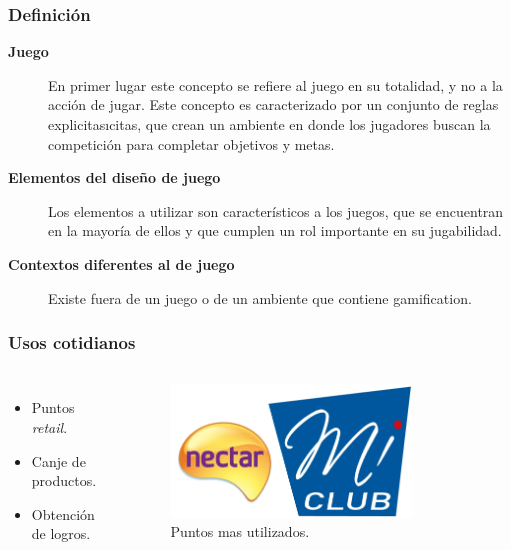 \documentclass[10pt, compress]{beamer}
\begin{document}
\begin{frame}
\frametitle{Definición}

\begin{description}
 \item[\textbf{Juego}] En primer lugar este concepto se refiere al juego en su totalidad, y no a la acción de jugar. 
Este concepto es caracterizado por un conjunto de reglas explicitasıcitas, que crean un ambiente en donde los 
jugadores buscan la competición para completar objetivos y metas.
 \item[\textbf{Elementos del diseño de juego}] Los elementos a utilizar son característicos a los juegos, que se 
encuentran en la mayoría de ellos y que cumplen un rol importante en su jugabilidad.
 \item[\textbf{Contextos diferentes al de juego}] Existe fuera de un juego o de un ambiente que contiene gamification.
\end{description}
\end{frame}

\begin{frame}
 \frametitle{Usos cotidianos}
\begin{columns}[onlytextwidth]

        \begin{itemize}[<+- | alert@+>]
          \item Puntos \emph{retail}.
          \item Canje de productos.
	  \item Obtención de logros.
        \end{itemize}

\begin{figure}
\centering
    \includegraphics[width=0.8\textwidth]{images/retail.png}
    \caption{Puntos mas utilizados.}
    \label{fig:awesome_image}
\end{figure}
\end{columns}
\end{frame}
\end{document}
